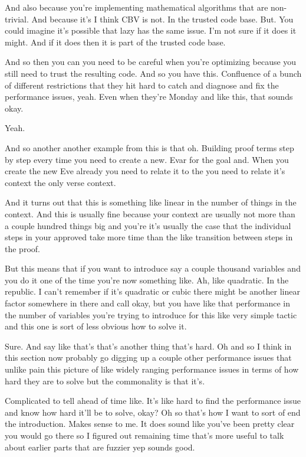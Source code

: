 \begin{subappendices}
    And also because you're implementing mathematical algorithms that are non-trivial. And because it's I think CBV is not. In the trusted code base. But. You could imagine it's possible that lazy has the same issue. I'm not sure if it does it might. And if it does then it is part of the trusted code base. 
    
    And so then you can you need to be careful when you're optimizing because you still need to trust the resulting code. And so you have this. Confluence of a bunch of different restrictions that they hit hard to catch and diagnose and fix the performance issues, yeah. Even when they're Monday and like this, that sounds okay. 
    
    Yeah. 
    
    And so another another example from this is that oh. Building proof terms step by step every time you need to create a new. Evar for the goal and. When you create the new Eve already you need to relate it to the you need to relate it's context the only verse context. 
    
    And it turns out that this is something like linear in the number of things in the context. And this is usually fine because your context are usually not more than a couple hundred things big and you're it's usually the case that the individual steps in your approved take more time than the like transition between steps in the proof. 
    
    But this means that if you want to introduce say a couple thousand variables and you do it one of the time you're now something like. Ah, like quadratic. In the republic. I can't remember if it's quadratic or cubic there might be another linear factor somewhere in there and call okay, but you have like that performance in the number of variables you're trying to introduce for this like very simple tactic and this one is sort of less obvious how to solve it. 
    
    Sure. And say like that's that's another thing that's hard. Oh and so I think in this section now probably go digging up a couple other performance issues that unlike pain this picture of like widely ranging performance issues in terms of how hard they are to solve but the commonality is that it's. 
    
    Complicated to tell ahead of time like. It's like hard to find the performance issue and know how hard it'll be to solve, okay? Oh so that's how I want to sort of end the introduction. Makes sense to me. It does sound like you've been pretty clear you would go there so I figured out remaining time that's more useful to talk about earlier parts that are fuzzier yep sounds good. 
    

\end{subappendices}
